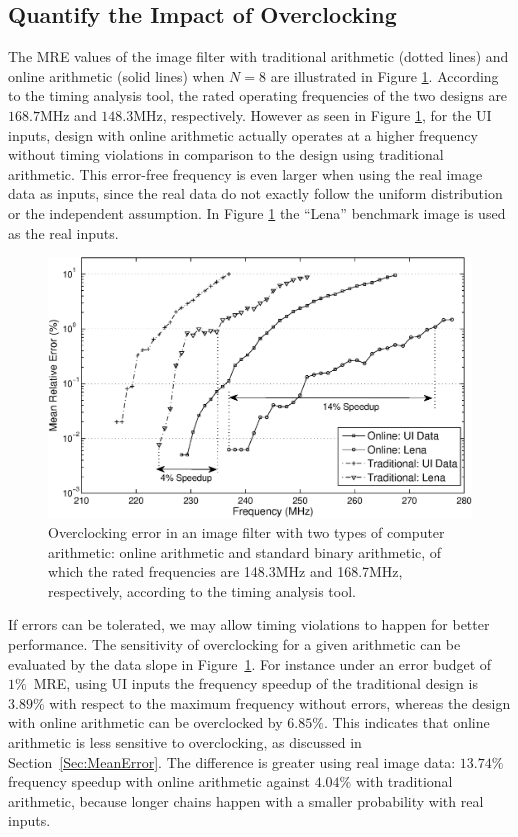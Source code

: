 \documentclass{acm_proc_article-sp}
\begin{document}
\subsection{Quantify the Impact of Overclocking}
The MRE values of the image filter with traditional arithmetic (dotted lines) and online arithmetic (solid lines) when $N=8$ are illustrated in Figure \ref{Fig:MRE_ImageFilter}. According to the timing analysis tool, the rated operating frequencies of the two designs are $168.7$MHz and $148.3$MHz, respectively. However as seen in Figure \ref{Fig:MRE_ImageFilter}, for the UI inputs, design with online arithmetic actually operates at a higher frequency without timing violations in comparison to the design using traditional arithmetic. This error-free frequency is even larger when using the real image data as inputs, since the real data do not exactly follow the uniform distribution or the independent assumption. In Figure \ref{Fig:MRE_ImageFilter} the ``Lena'' benchmark image is used as the real inputs.
%
\begin{figure}
    \centering
    \includegraphics[width=.48\textwidth]{./Figures/MRE.eps}
    \vspace{-4ex}
    \caption{Overclocking error in an image filter with two types of computer arithmetic: online arithmetic and standard binary arithmetic, of which the rated frequencies are 148.3MHz and 168.7MHz, respectively, according to the timing analysis tool.}
    \label{Fig:MRE_ImageFilter}
    \vspace{-3ex}
\end{figure}

\vspace{-1ex}
If errors can be tolerated, we may allow timing violations to happen for better performance. The sensitivity of overclocking for a given arithmetic can be evaluated by the data slope in Figure~\ref{Fig:MRE_ImageFilter}. For instance under an error budget of $1\%$~MRE, using UI inputs the frequency speedup of the traditional design is $3.89\%$ with respect to the maximum frequency without errors, whereas the design with online arithmetic can be overclocked by $6.85\%$. This indicates that online arithmetic is less sensitive to overclocking, as discussed in Section~\ref{Sec:MeanError}. The difference is greater using real image data: $13.74\%$ frequency speedup with online arithmetic against $4.04\%$ with traditional arithmetic, because longer chains happen with a smaller probability with real inputs.\vspace{-1ex}
\end{document}
